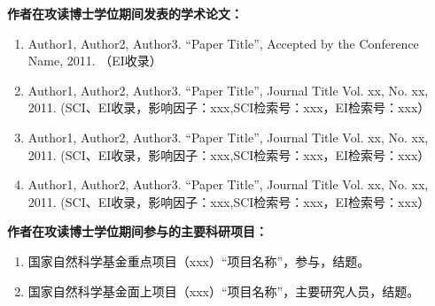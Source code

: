\ifx\atempxetex\usewhat 
\fi
{}


\noindent \large \textbf{作者在攻读博士学位期间发表的学术论文：}
\vspace{15pt}

\begin{enumerate}

\item Author1, Author2, Author3. “Paper Title”, Accepted by the Conference Name, 2011. （EI收录）

\item Author1, Author2, Author3. “Paper Title”, Journal Title Vol. xx, No. xx, 2011. (SCI、EI收录，影响因子：xxx,SCI检索号：xxx，EI检索号：xxx）

\item Author1, Author2, Author3. “Paper Title”, Journal Title Vol. xx, No. xx, 2011. (SCI、EI收录，影响因子：xxx,SCI检索号：xxx，EI检索号：xxx）

\item Author1, Author2, Author3. “Paper Title”, Journal Title Vol. xx, No. xx, 2011. (SCI、EI收录，影响因子：xxx,SCI检索号：xxx，EI检索号：xxx）

\end{enumerate}

\vspace{100pt}
\vspace{15pt}
\noindent \large \textbf{作者在攻读博士学位期间参与的主要科研项目：}
\vspace{15pt}

\begin{enumerate}
 \item 国家自然科学基金重点项目（xxx）“项目名称”，参与，结题。
 \item 国家自然科学基金面上项目（xxx）“项目名称”，主要研究人员，结题。
\end{enumerate}
